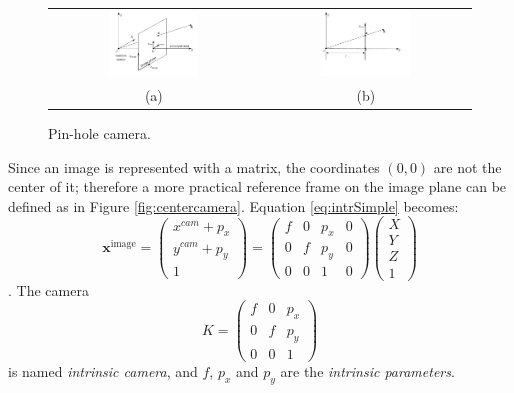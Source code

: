 \begin{figure}[t]
\centering
 \begin{tabular}{cc}
  \includegraphics[width=0.45\textwidth]{./img/ch-camera/camera}&
  \includegraphics[width=0.45\textwidth]{./img/ch-camera/camera01}\\
  (a)&(b)
 \end{tabular}
 \caption{Pin-hole camera.}
 \label{fig:pinhole}
\end{figure}
Since an image is represented with a matrix, the coordinates $(0,0)$ are not the center of it; therefore a more practical reference frame on the image plane can be defined as in Figure \ref{fig:centercamera}. Equation \eqref{eq:intrSimple} becomes:
\begin{equation}
\label{eq:intrCompl}
 \mathbf{x}^{\text{image}} = 
 \begin{pmatrix}
 x^{cam} + p_x\\
 y^{cam} + p_y\\
 1
 \end{pmatrix} =
 \begin{pmatrix}
 f&0&p_x&0\\
 0&f&p_y&0\\
 0&0&1&0
 \end{pmatrix} 
 \begin{pmatrix}
 X\\
 Y\\
 Z\\
 1
 \end{pmatrix}
\end{equation}.
The camera 
\begin{equation}
\label{eq:kmatr}
K = 
\begin{pmatrix}
 f&0&p_x\\
 0&f&p_y\\
 0&0&1
 \end{pmatrix} 
\end{equation}
is named \emph{intrinsic camera}, and $f$, $p_x$ and $p_y$ are the \emph{intrinsic parameters}. 

